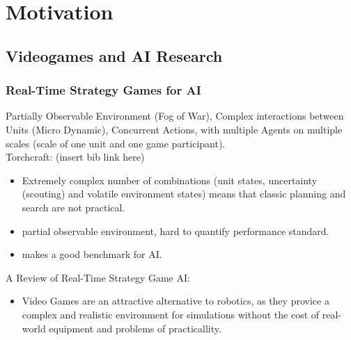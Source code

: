 
\chapter{Motivation}
\label{ch:Motivation}

\section{Videogames and AI Research}

\subsection{Real-Time Strategy Games for AI}
\label{ch:Motivation:RTS4AI}
Partially Observable Environment (Fog of War), Complex interactions between Units (Micro Dynamic), Concurrent Actions, with multiple Agents on multiple scales (scale of one unit and one game participant).
\\
Torchcraft: (insert bib link here)
\begin{itemize}[noitemsep,nolistsep]
	\item Extremely complex number of combinations (unit states, uncertainty (scouting) and volatile environment states) means that classic planning and search are not practical. 
	\item partial observable environment, hard to quantify performance standard.
	\item makes a good benchmark for AI.
\end{itemize}
A Review of Real-Time Strategy Game AI:
\begin{itemize}[noitemsep,nolistsep]
	\item Video Games are an attractive alternative to robotics, as they provice a complex and realistic environment for simulations without the cost of real-world equipment and problems of practicallity.
\end{itemize}